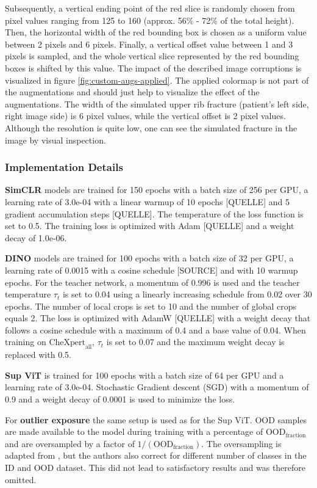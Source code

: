Subsequently, a vertical ending point of the red slice is randomly chosen from pixel values ranging from 125 to 160 (approx. 56\% - 72\% of the total height).
Then, the horizontal width of the red bounding box is chosen as a uniform value between 2 pixels and 6 pixels.
Finally, a vertical offset value between 1 and 3 pixels is sampled, and the whole vertical slice represented by the red bounding boxes is shifted by this value.
The impact of the described image corruptions is visualized in figure \ref{fig:custom-augs-applied}.
The applied colormap is not part of the augmentations and should just help to visualize the effect of the augmentations.
The width of the simulated upper rib fracture (patient's left side, right image side) is 6 pixel values, while the vertical offset is 2 pixel values.
Although the resolution is quite low, one can see the simulated fracture in the image by visual inspection.
\subsubsection*{Implementation Details}
\textbf{SimCLR} models are trained for 150 epochs with a batch size of 256 per GPU, a learning rate of 3.0e-04 with a linear warmup of 10 epochs [QUELLE] and 5 gradient accumulation steps [QUELLE]. 
The temperature of the loss function is set to 0.5. 
The training loss is optimized with Adam [QUELLE] and a weight decay of 1.0e-06.
\par
\textbf{DINO} models are trained for 100 epochs with a batch size of 32 per GPU, a learning rate of 0.0015 with a cosine schedule [SOURCE] and with 10 warmup epochs.
For the teacher network, a momentum of 0.996 is used and the teacher temperature $\tau_t$ is set to 0.04 using a linearly increasing schedule from 0.02 over 30 epochs.
The number of local crops is set to 10 and the number of global crops equals 2. 
The loss is optimized with AdamW [QUELLE] with a weight decay that follows a cosine schedule with a maximum of 0.4 and a base value of 0.04.
When training on $\text{CheXpert}_\text{all}$, $\tau_t$ is set to 0.07 and the maximum weight decay is replaced with 0.5.
\par
\textbf{Sup ViT} is trained for 100 epochs with a batch size of 64 per GPU and a learning rate of 3.0e-04. 
Stochastic Gradient descent (SGD) with a momentum of 0.9 and a weight decay of 0.0001 is used to minimize the loss.
\par
For \textbf{outlier exposure} the same setup is used as for the Sup ViT.
OOD samples are made available to the model during training with a percentage of $\text{OOD}_\text{fraction}$ and are oversampled by a factor of $1/(\text{OOD}_\text{fraction})$.
The oversampling is adapted from \citep{Fort2021}, but the authors also correct for different number of classes in the ID and OOD dataset.
This did not lead to satisfactory results and was therefore omitted.
